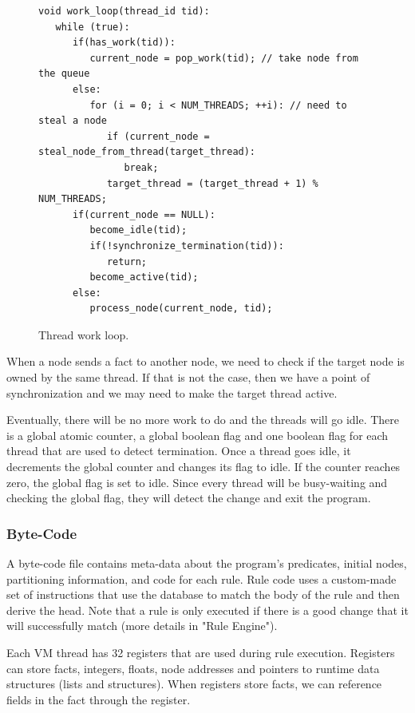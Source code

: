 \begin{figure}[h!]
   \vspace{-0.5\intextsep}
\scriptsize\begin{Verbatim}
void work_loop(thread_id tid):
   while (true):
      if(has_work(tid)):
         current_node = pop_work(tid); // take node from the queue
      else:
         for (i = 0; i < NUM_THREADS; ++i): // need to steal a node
            if (current_node = steal_node_from_thread(target_thread):
               break;
            target_thread = (target_thread + 1) % NUM_THREADS;
      if(current_node == NULL):
         become_idle(tid);
         if(!synchronize_termination(tid)):
            return;
         become_active(tid);
      else:
         process_node(current_node, tid);
\end{Verbatim}
\vspace{-0.5\intextsep}
  \caption{Thread work loop.}
  \label{code:work_loop}
  \vspace{-0.5\intextsep}
\end{figure}

When a node sends a fact to another node, we need to check if the target node is owned by the same thread.
If that is not the case, then we have a point of synchronization and we may need to
make the target thread active.

Eventually, there will be no more work to do and the threads will go idle. There is a global atomic counter, a global
boolean flag and one boolean flag for each thread that are used to detect termination.
Once a thread goes idle, it decrements the global counter and changes its flag to idle. If the counter
reaches zero, the global flag is set to idle. Since every thread will be busy-waiting and checking
the global flag, they will detect the change and exit the program.

\subsubsection{Byte-Code}

A byte-code file contains meta-data about the program's predicates, initial nodes, partitioning
information, and code for each rule. Rule code uses a custom-made set of instructions that
use the database to match the body of the rule and then derive the head. Note that a rule
is only executed if there is a good change that it will successfully match (more details
in "Rule Engine").

Each VM thread has 32 registers that are used during rule execution.
Registers can store facts, integers, floats, node addresses and pointers to runtime 
data structures (lists and structures). When registers store facts, we can reference
fields in the fact through the register.

